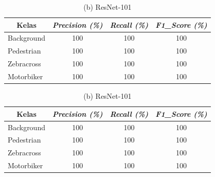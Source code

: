 \begin{table}[!h]
	\centering
	\begin{minipage}[b]{\textwidth}
		\centering
		\begin{tabular}{|l|c|c|c|}
			\hline
			\multicolumn{1}{|c|}{\textbf{Kelas}} & \textit{\textbf{Precision (\%)}} & \textit{\textbf{Recall (\%)}} & \textit{\textbf{F1\_Score (\%)}} \\ \hline
			Background                           & 100                              & 100                           & 100                              \\ \hline
			Pedestrian                           & 100                              & 100                           & 100                              \\ \hline
			Zebracross                           & 100                              & 100                           & 100                              \\ \hline
			Motorbiker                           & 100                              & 100                           & 100                              \\ \hline
		\end{tabular}
		\caption*{(a) ResNet-50}
	\end{minipage}
	\vfill
	\begin{minipage}[b]{\textwidth}
		\centering
		\begin{tabular}{|l|c|c|c|}
			\hline
			\multicolumn{1}{|c|}{\textbf{Kelas}} & \textit{\textbf{Precision (\%)}} & \textit{\textbf{Recall (\%)}} & \textit{\textbf{F1\_Score (\%)}} \\ \hline
			Background                           & 100                              & 100                           & 100                              \\ \hline
			Pedestrian                           & 100                              & 100                           & 100                              \\ \hline
			Zebracross                           & 100                              & 100                           & 100                              \\ \hline
			Motorbiker                           & 100                              & 100                           & 100                              \\ \hline
		\end{tabular}
		\caption*{(b) ResNet-101}
	\end{minipage}

\end{table}
